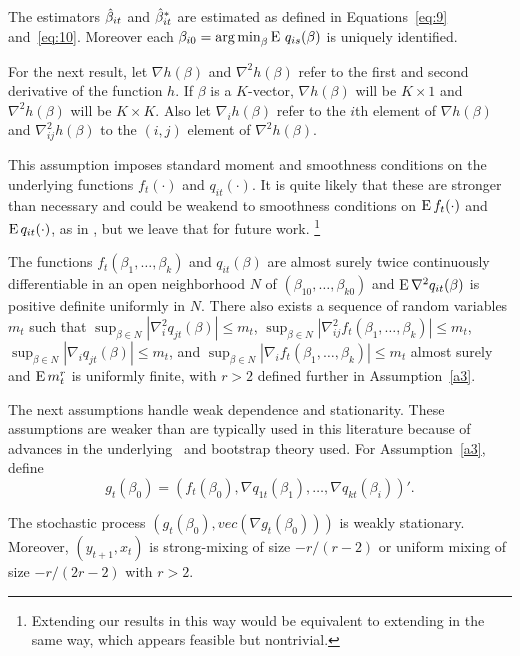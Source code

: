 \documentclass[12pt,fleqn]{article}
\begin{document}
\begin{asmp}\label{a1}
  The estimators $\hat \beta_{it}$ and $\hat \beta_{it}^*$ are estimated as defined in
  Equations~\eqref{eq:9} and~\eqref{eq:10}. Moreover each $\beta_{i0} =
  \operatorname*{arg\,min}_\beta \operatorname{E}\, q_{is}(\beta)$ is uniquely identified.
\end{asmp}

For the next result, let $\nabla h(\beta)$ and $\nabla^2 h(\beta)$
refer to the first and second derivative of the function $h$. If
$\beta$ is a $K$-vector, $\nabla h(\beta)$ will be $K \times 1$ and
$\nabla^2 h(\beta)$ will be $K \times K$. Also let $\nabla_i h(\beta)$
refer to the $i$th element of $\nabla h(\beta)$ and $\nabla_{ij}^2
h(\beta)$ to the $(i,j)$ element of $\nabla^2 h(\beta)$.

This assumption imposes standard moment and smoothness conditions on
the underlying functions $f_t(\cdot)$ and $q_{it}(\cdot)$. It is quite
likely that these are stronger than necessary and could be weakend to
smoothness conditions on $\operatorname{E} f_t(\cdot)$ and $\operatorname{E} q_{it}(\cdot)$, as in
\cite{Mcc:00}, but we leave that for future work.%
\footnote{Extending our results in this way would be equivalent to
  extending \cite{JoD:00} in the same way, which appears feasible but
  nontrivial.} %

\begin{asmp}\label{a2}
  The functions $f_t(\beta_1,\dots,\beta_k)$ and $q_{it}(\beta)$ are
  almost surely twice continuously differentiable in an open
  neighborhood $N$ of $(\beta_{10},\dots,\beta_{k0})$ and $\operatorname{E} \nabla^2
  q_{it}(\beta)$ is positive definite uniformly in $N$. There also
  exists a sequence of random variables $m_t$ such that
  $\sup_{\beta \in N} |\nabla_i^2 q_{jt}(\beta)| \leq m_t$,
  $\sup_{\beta \in N} |\nabla_{ij}^2 f_t(\beta_1,\dots,\beta_k)| \leq m_t$,
  $\sup_{\beta \in N} |\nabla_i q_{jt}(\beta)| \leq m_t$, and
  $\sup_{\beta \in N} |\nabla_i f_t(\beta_1,\dots,\beta_k)| \leq m_t$
  almost surely and $\operatorname{E} m_t^r$ is uniformly finite, with $r > 2$
  defined further in Assumption~\ref{a3}.
\end{asmp}

The next assumptions handle weak dependence and stationarity. These
assumptions are weaker than are typically used in this literature
because of advances in the underlying \clt\ and bootstrap theory used.
For Assumption~\ref{a3}, define
\[
  g_t(\beta_0) = (f_t(\beta_0), \nabla q_{1t}(\beta_1),\dots,\nabla q_{kt}(\beta_i))'.
\]

\begin{asmp}\label{a3}
  The stochastic process $(g_t(\beta_0), vec(\nabla g_t(\beta_0)))$ is
  weakly stationary. Moreover, $(y_{t+1},x_t)$ is strong-mixing of
  size $-r/(r-2)$ or uniform mixing of size $-r/(2r-2)$ with $r>2$.
\end{asmp}
\end{document}
